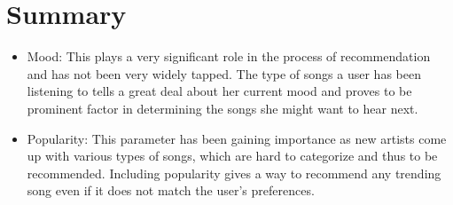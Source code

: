 	\section{Summary}
\begin{itemize}
	\item Mood: This plays a very significant role in the process of recommendation and has not been very widely tapped. The type of songs a user has been listening to tells a great deal about her current mood and proves to be prominent factor in determining the songs she might want to hear next.
	\item Popularity: This parameter has been gaining importance as new artists come up with various types of songs, which are hard to categorize and thus to be recommended. Including popularity gives a way to recommend any trending song even if it does not match the user's preferences.
\end{itemize}
